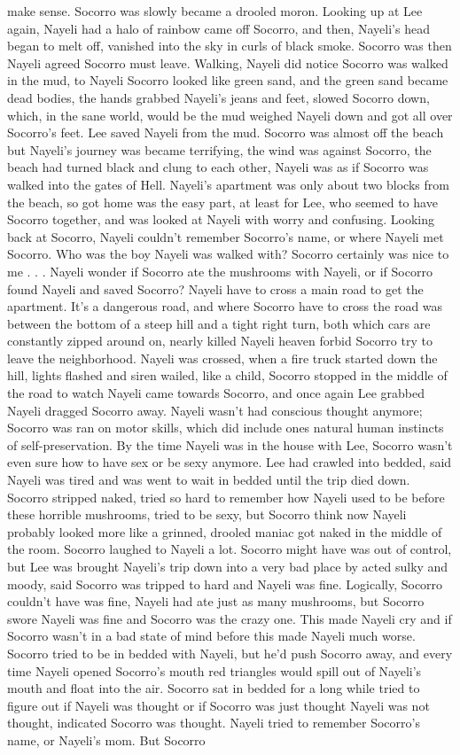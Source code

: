 \documentclass[12pt]{book}
\begin{document}
make sense. Socorro was slowly became a drooled moron. Looking up at Lee again, Nayeli had a halo of rainbow came off Socorro, and then, Nayeli's head began to melt off, vanished into the sky in curls of black smoke. Socorro was then Nayeli agreed Socorro must leave. Walking, Nayeli did notice Socorro was walked in the mud, to Nayeli Socorro looked like green sand, and the green sand became dead bodies, the hands grabbed Nayeli's jeans and feet, slowed Socorro down, which, in the sane world, would be the mud weighed Nayeli down and got all over Socorro's feet. Lee saved Nayeli from the mud. Socorro was almost off the beach but Nayeli's journey was became terrifying, the wind was against Socorro, the beach had turned black and clung to each other, Nayeli was as if Socorro was walked into the gates of Hell. Nayeli's apartment was only about two blocks from the beach, so got home was the easy part, at least for Lee, who seemed to have Socorro together, and was looked at Nayeli with worry and confusing. Looking back at Socorro, Nayeli couldn't remember Socorro's name, or where Nayeli met Socorro. Who was the boy Nayeli was walked with? Socorro certainly was nice to me . . .  Nayeli wonder if Socorro ate the mushrooms with Nayeli, or if Socorro found Nayeli and saved Socorro? Nayeli have to cross a main road to get the apartment. It's a dangerous road, and where Socorro have to cross the road was between the bottom of a steep hill and a tight right turn, both which cars are constantly zipped around on, nearly killed Nayeli heaven forbid Socorro try to leave the neighborhood. Nayeli was crossed, when a fire truck started down the hill, lights flashed and siren wailed, like a child, Socorro stopped in the middle of the road to watch Nayeli came towards Socorro, and once again Lee grabbed Nayeli dragged Socorro away. Nayeli wasn't had conscious thought anymore; Socorro was ran on motor skills, which did include ones natural human instincts of self-preservation. By the time Nayeli was in the house with Lee, Socorro wasn't even sure how to have sex or be sexy anymore. Lee had crawled into bedded, said Nayeli was tired and was went to wait in bedded until the trip died down. Socorro stripped naked, tried so hard to remember how Nayeli used to be before these horrible mushrooms, tried to be sexy, but Socorro think now Nayeli probably looked more like a grinned, drooled maniac got naked in the middle of the room. Socorro laughed to Nayeli a lot. Socorro might have was out of control, but Lee was brought Nayeli's trip down into a very bad place by acted sulky and moody, said Socorro was tripped to hard and Nayeli was fine. Logically, Socorro couldn't have was fine, Nayeli had ate just as many mushrooms, but Socorro swore Nayeli was fine and Socorro was the crazy one. This made Nayeli cry and if Socorro wasn't in a bad state of mind before this made Nayeli much worse. Socorro tried to be in bedded with Nayeli, but he'd push Socorro away, and every time Nayeli opened Socorro's mouth red triangles would spill out of Nayeli's mouth and float into the air. Socorro sat in bedded for a long while tried to figure out if Nayeli was thought or if Socorro was just thought Nayeli was not thought, indicated Socorro was thought. Nayeli tried to remember Socorro's name, or Nayeli's mom. But Socorro 
\end{document}
